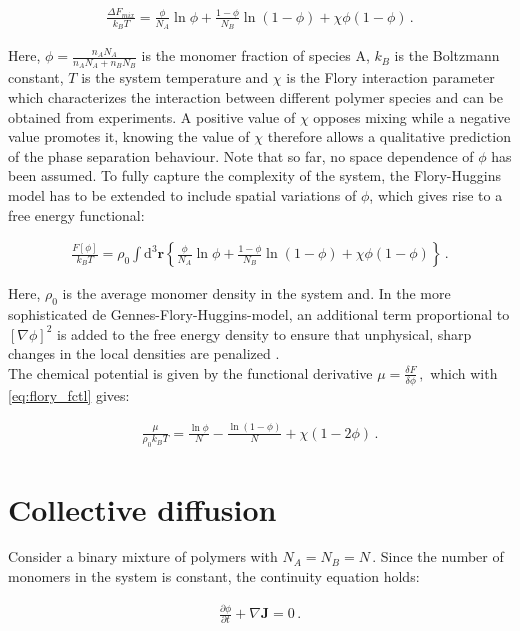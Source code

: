 \documentclass[bachelor,       %
               twoside,        %
               BCOR10mm,       %
                ngerman,english  %
               ]{GAUBM}
\begin{document}
\begin{align}
  \frac{\Delta F_{mix}}{k_BT}=\frac{\phi}{N_A}\ln\phi+\frac{1-\phi}{N_B}\ln(1-\phi)+\chi\phi(1-\phi)\,.
\end{align}

Here, $\phi=\frac{n_AN_A}{n_AN_A+n_BN_B}$ is the monomer fraction of species A, $k_B$ is the Boltzmann constant, $T$ is the system temperature and $\chi$ is the Flory interaction parameter which characterizes the interaction between different polymer species and can be obtained from experiments. A positive value of $\chi$ opposes mixing while a negative value promotes it, knowing the value of $\chi$ therefore allows a qualitative prediction of the phase separation behaviour. Note that so far, no space dependence of $\phi$ has been assumed. To fully capture the complexity of the system, the Flory-Huggins model has to be extended to include spatial variations of $\phi$, which gives rise to a free energy functional:


\begin{align}
  \frac{F[\phi]}{k_BT}=\rho_0\int \mathrm{d}^3\mathbf{r}\left\{\frac{\phi}{N_A}\ln\phi+\frac{1-\phi}{N_B}\ln(1-\phi)+\chi\phi(1-\phi)\right\}\,.
  \label{eq:flory_fctl}
\end{align}

Here, $\rho_0$ is the average monomer density in the system and. In the more sophisticated de Gennes-Flory-Huggins-model, an additional term proportional to $[\nabla\phi]^2$ is added to the free energy density to ensure that unphysical, sharp changes in the local densities are penalized \cite{deGennes80}. \\
The chemical potential is given by the functional derivative $\mu=\frac{\delta F}{\delta\phi}\,,$ which with \eqref{eq:flory_fctl} gives:

\begin{align}
  \frac{\mu}{\rho_0 k_BT}=\frac{\ln\phi}{N}-\frac{\ln(1-\phi)}{N}+\chi(1-2\phi)\,.
  \label{eq:chempot}
\end{align}

\section{Collective diffusion}

Consider a binary mixture of polymers with $N_A=N_B=N\,.$ Since the number of monomers in the system is constant, the continuity equation holds:

\begin{align}
  \frac{\partial\phi}{\partial t}+\nabla\mathbf{J}=0\,.
  \label{eq:conti}
\end{align}
\end{document}
